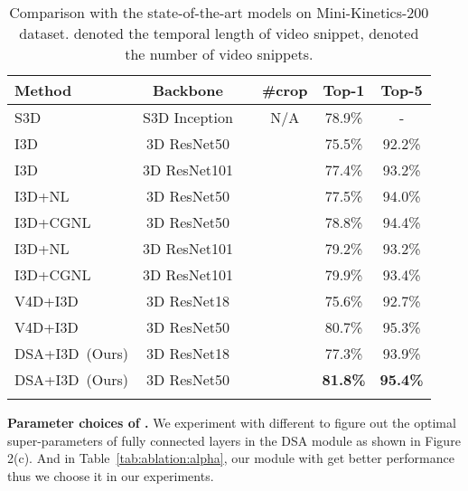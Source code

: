 \documentclass[sigconf]{acmart}
\begin{document}
{{\begin{table*}[th]
\caption{Comparison with the state-of-the-art models on Mini-Kinetics-200 dataset.  denoted the temporal length of video snippet,  denoted the number of video snippets.}
\begin{center}
\begin{tabular}{lccccc}
\shline
{ Method} & { Backbone} & { } & { \#crop} & {Top-1} & {Top-5}\\
\hline
S3D~\cite{s3d} & {S3D Inception} & {} & {N/A}& 78.9\% & -\\
I3D~\cite{CGNLNetwork2018} &{3D ResNet50} & {} &{} &75.5\% & 92.2\% \\
I3D~\cite{CGNLNetwork2018} &{3D ResNet101} & {} &{} &77.4\% & 93.2\% \\
I3D+NL~\cite{CGNLNetwork2018} &{3D ResNet50} & {} &{} &77.5\% & 94.0\% \\
I3D+CGNL~\cite{CGNLNetwork2018} & {3D ResNet50} & {} &{} & 78.8\% & 94.4\% \\
I3D+NL~\cite{CGNLNetwork2018} & {3D ResNet101} & {} &{} & 79.2\% & 93.2\% \\
I3D+CGNL~\cite{CGNLNetwork2018} & {3D ResNet101} & {} &{} & 79.9\% & 93.4\% \\ \hline
V4D+I3D ~\cite{zhang2020v4d} &{3D ResNet18} & {} & {} & 75.6\% &  92.7\% \\
V4D+I3D ~\cite{zhang2020v4d} &{3D ResNet50} & {} & {} & 80.7\% &  95.3\% \\
\hline
DSA+I3D~(Ours) &{3D ResNet18} & {} & {} & 77.3\% &  93.9\% \\
DSA+I3D~(Ours) &{3D ResNet50} & {} & {} & \textbf{81.8\%} &  \textbf{95.4\%} \\
\shline
\end{tabular}
\end{center}
\label{cmp_minik200}
\end{table*} 
\textbf{Parameter choices of .}
We experiment with different  to figure out the optimal super-parameters of fully connected layers in the DSA module as shown in Figure 2(c). And in Table~\ref{tab:ablation:alpha}, our module with  get better performance thus we choose it in our experiments.



\begin{table*}[th]
\centering
\caption{Comparison with the state-of-the-art models on Kinetics-400 dataset. We report the inference cost by computing the GFLOPs.  indicates the result of our calculation using the official model.}
\end{table*}}}
\end{document}
